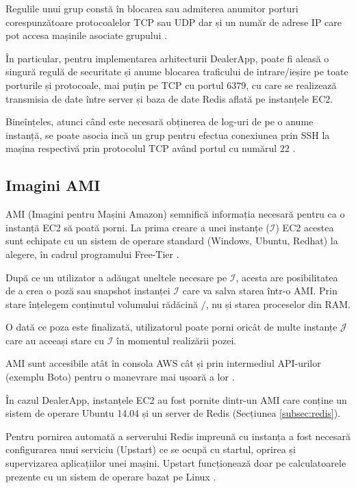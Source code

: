 \documentclass[oneside, 12pt]{book}
\begin{document}
Regulile unui grup constă în blocarea sau admiterea anumitor porturi corespunzătoare protocoalelor TCP sau UDP dar și un număr de adrese IP care pot accesa mașinile asociate grupului \cite{protocol:1980rfc, forouzan:2002tcp}.

În particular, pentru implementarea arhitecturii DealerApp, poate fi aleasă o singură regulă de securitate și anume blocarea traficului de intrare/ieșire pe toate porturile și protocoale, mai puțin pe TCP cu portul $6379$, cu care se realizează transmisia de date între server și baza de date Redis aflată pe instanțele EC2.



Bineînțeles, atunci când este necesară obținerea de log-uri de pe o anume instanță, se poate asocia incă un grup pentru efectua conexiunea prin SSH la mașina respectivă prin protocolul TCP având portul cu numărul $22$ \cite{ylonen:2006secure}.


\subsection{Imagini AMI}

AMI (Imagini pentru Mașini Amazon) semnifică informația necesară pentru ca o instanță EC2 să poată porni. La prima creare a unei instanțe ($\mathcal{I}$) EC2 acestea sunt echipate cu un sistem de operare standard (Windows, Ubuntu, Redhat) la alegere, în cadrul programului Free-Tier \cite{website:aws-docs}.

După ce un utilizator a adăugat uneltele necesare pe $\mathcal{I}$, acesta are posibilitatea de a crea o poză sau snapshot instanței $\mathcal{I}$ care va salva starea într-o AMI. Prin stare înțelegem conținutul volumului rădăcină $/$, nu și starea proceselor din RAM.

O dată ce poza este finalizată, utilizatorul poate porni oricât de multe instanțe $\mathcal{J}$ care au aceeași stare cu $\mathcal{I}$ în momentul realizării pozei.

AMI sunt accesibile atât în consola AWS cât și prin intermediul API-urilor (exemplu Boto) pentru o manevrare mai ușoară a lor \cite{website:boto-docs}. 

În cazul DealerApp, instanțele EC2 au fost pornite dintr-un AMI care conține un sistem de operare Ubuntu 14.04 și un server de Redis (Secțiunea \ref{subsec:redis}).

Pentru pornirea automată a serverului Redis impreună cu instanța a fost necesară configurarea unui serviciu (Upstart) ce se ocupă cu startul, oprirea și supervizarea aplicațiilor unei mașini. Upstart funcționează doar pe calculatoarele prezente cu un sistem de operare bazat pe Linux \cite{website:upstart}.
\end{document}
